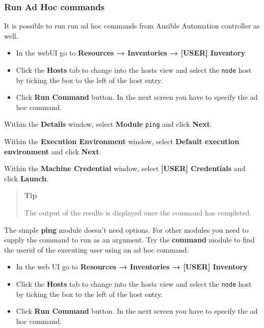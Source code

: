 \hypertarget{run-ad-hoc-commands}{%
\subsubsection{Run Ad Hoc commands}\label{run-ad-hoc-commands}}

It is possible to run run ad hoc commands from Ansible Automation
controller as well.

\begin{itemize}
\item
  In the webUI go to \textbf{Resources → Inventories → [USER]
  Inventory}
\item
  Click the \textbf{Hosts} tab to change into the hosts view and select
  the \texttt{node} host by ticking the box to the left of the host entry.
\item
  Click \textbf{Run Command} button. In the next screen you have to
  specify the ad hoc command.
\end{itemize}

Within the \textbf{Details} window, select \textbf{Module} \texttt{ping}
and click \textbf{Next}.

Within the \textbf{Execution Environment} window, select \textbf{Default
execution environment} and click \textbf{Next}.

Within the \textbf{Machine Credential} window, select \textbf{[USER]
Credentials} and click \textbf{Launch}.

\begin{quote}
\textbf{Tip}

The output of the results is displayed once the command has completed.
\end{quote}

The simple \textbf{ping} module doesn't need options. For other modules
you need to supply the command to run as an argument. Try the
\textbf{command} module to find the userid of the executing user using
an ad hoc command.

\begin{itemize}
\item
    In the web UI go to \textbf{Resources → Inventories → [USER]
  Inventory}
\item
  Click the \textbf{Hosts} tab to change into the hosts view and select
  the \texttt{node} host by ticking the box to the left of the host entry.
\item
  Click \textbf{Run Command} button. In the next screen you have to
  specify the ad hoc command.
\end{itemize}

